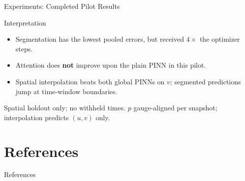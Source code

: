 \documentclass[12pt]{beamer}
\begin{document}
\begin{frame}{Experiments: Completed Pilot Results}
\vspace{0.06cm}

\begin{block}{Interpretation}

\begin{itemize}\setlength{\itemsep}{0.06cm}

  \item Segmentation has the lowest pooled errors, but received \textbf{$4\times$} the optimizer steps.

  \item Attention does \textbf{not} improve upon the plain PINN in this pilot.

  \item Spatial interpolation beats both global PINNs on $v$; segmented predictions jump at time-window boundaries.

\end{itemize}

\end{block}

\vspace{-0.07cm}

{\scriptsize\color{steel}Spatial holdout only; no withheld times. $p$ gauge-aligned per snapshot; interpolation predicts $(u,v)$ only.}

\end{frame}


\section{References}


\begin{frame}[allowframebreaks]{References}


\end{frame}

\end{document}
